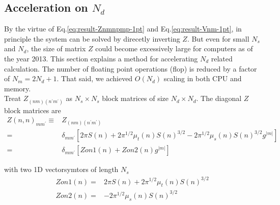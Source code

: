 \documentclass [10pt,letterpaper]{article}
\begin{document}
\subsection{Acceleration on $N_d$}
\label{sub:acceleration-on-Nd}

By the virtue of Eq.\eqref{eq:result-Znmnpmp-1pt} and Eq.\eqref{eq:result-Vnm-1pt}, in principle the system can be solved by direcetly inverting $Z$. 
But  even for small $N_s$ and $N_d$, the size of matrix $Z$ could become excessively large for computers as of the year 2013.  
This section explains a method for accelerating $N_d$ related calculation. 
The number of floating point operations (flop) is reduced by a factor of $N_m=2N_d+1$. 
That said, we achieved $O(N_d)$ scaling in both CPU and memory.
\\

Treat $Z_{(n m)(n^\prime m^\prime)}$ as $N_s\times N_s$ block matrices of size $N_d\times N_d$. The diagonal $Z$ block matrices are
\begin{equation} \label{eq:def-Znnp-diagonal}
	\begin{split}
		Z(n,n)_{m m^\prime}
		\equiv
		& 
		Z_{(n m)(n^\prime m^\prime)}
		\\
		=&
		\delta_{m m^\prime}
		[
			2\pi S(n)
			+
			2\pi^{1/2}
			\mu_t(n)
			S(n)^{3/2}
			-
			2\pi^{1/2}
			\mu_s(n)
			S(n)^{3/2}
			g^{\lvert m \rvert}
		]
		\\
		=&
		\delta_{m m^\prime}
		[
			Zon1(n)
			+
			Zon2(n)
			g^{\lvert m \rvert}
		]
	\end{split}
\end{equation}

with two 1D vectorsymtors of length $N_s$
\begin{subequations} \label{eq:def-Zon1-Zon2}
	\begin{align}
		Zon1(n)
		=&
		2\pi S(n)
		+
		2\pi^{1/2}
		\mu_t(n)
		S(n)^{3/2}
		\label{eq:def-Zon1}
		\\
		Zon2(n)
		=& 
		-
		2\pi^{1/2}
		\mu_s(n)
		S(n)^{3/2}
		\label{eq:def_Zon2}
	\end{align}
\end{subequations}
\end{document}
